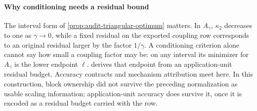 \paragraph{Why conditioning needs a residual bound}
The interval form of \cref{prop:audit-triangular-optimum} matters. In $A_\gamma$,
$\kappa_2$ decreases to one as $\gamma\to0$, while a fixed residual on the exported coupling
row corresponds to an original residual larger by the factor $1/\gamma$. A conditioning
criterion alone cannot say how small a coupling factor may be: on any interval its
minimizer for $A_\gamma$ is the lower endpoint $\ell$.  derives that
endpoint from an application-unit residual budget. Accuracy contracts and mechanism attribution meet here.
In this construction, block ownership did not survive the preceding normalization as usable
scaling information;
application-unit accuracy does survive it, once it is encoded as a residual budget carried
with the row.
